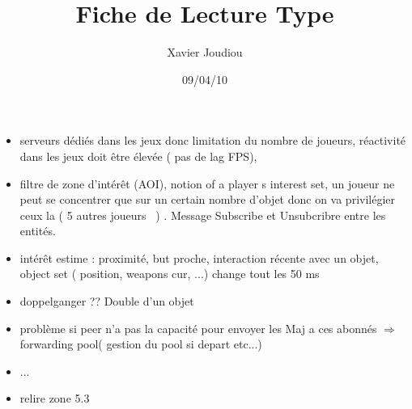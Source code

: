 \documentclass[11pt,a4paper]{article}
\title{Fiche de Lecture Type}
\author{Xavier Joudiou}
\date{09/04/10}
\begin{document}
	
  \begin{itemize}
  \renewcommand{\labelitemi}{$\Rightarrow$}
	\item serveurs dédiés dans les jeux donc limitation du nombre de joueurs, réactivité dans les jeux doit être élevée ( pas de lag FPS),
	\item filtre de zone d'intérêt (AOI), notion of a player s interest set, un joueur ne peut se concentrer que sur un certain nombre d'objet donc on va privilégier ceux la ( 5 autres joueurs ~) . Message Subscribe et Unsubcribre entre les entités.
	\item intérêt estime : proximité, but proche, interaction récente avec un objet, object set ( position, weapons cur, ...) change tout les 50 ms
	\item doppelganger ?? Double d'un objet 
	\item problème si peer n'a pas la capacité  pour envoyer les Maj a ces abonnés $\Rightarrow$ forwarding pool( gestion du pool si depart etc...)
	\item ...
	\item relire zone 5.3
  \end{itemize}
\end{document}
